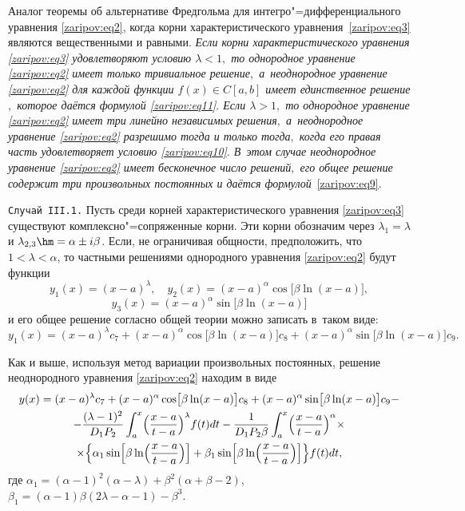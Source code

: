 {\small\sc Аналог теоремы об альтернативе Фредгольма для интегро"=дифференциального уравнения \eqref{zaripov:eq2}, когда корни характеристического уравнения~\eqref{zaripov:eq3} являются вещественными и равными.} 
\emph{Если корни характеристического уравнения \eqref{zaripov:eq3} удовлетворяют условию $\lambda<1,$  то однородное уравнение \eqref{zaripov:eq2} имеет только тривиальное решение$,$ а~неоднородное уравнение \eqref{zaripov:eq2} для каждой функции $f(x)\in C[a,b]$  имеет единственное решение$,$ которое даётся формулой \eqref{zaripov:eq11}$.$ 
Если $\lambda>1,$  то однородное уравнение \eqref{zaripov:eq2} имеет три линейно независимых решения$,$ а~неоднородное уравнение \eqref{zaripov:eq2} разрешимо тогда и только тогда$,$ когда его правая часть удовлетворяет условию \eqref{zaripov:eq10}$.$ 
В~этом  случае неоднородное уравнение \eqref{zaripov:eq2} имеет бесконечное число решений$,$  его общее решение содержит три произвольных постоянных и даётся формулой}~\eqref{zaripov:eq9}.


\smallskip

\texttt{Случай III.1.}  
Пусть среди корней характеристического уравнения \eqref{zaripov:eq3} существуют комплексно"=сопряженные корни. 
Эти корни обозначим через ${\lambda_1=\lambda}$ и ${\lambda_{2,3}}\hm ={\alpha}\pm{i\beta}$. 
Если, не ограничивая общности, предположить, что $1<\lambda<\alpha$, то частными решениями однородного уравнения \eqref{zaripov:eq2} будут функции
 $$
 y_1(x)=(x-a)^{\lambda},\quad  y_2(x)=(x-a)^\alpha\cos\bigl[\beta\ln(x-a)\bigr],$$
 $$ y_3(x)=(x-a)^\alpha\sin\bigl[\beta\ln(x-a)\bigr]$$ 
 и его общее решение согласно общей теории можно записать в~таком виде:
  \begin{equation*}
y_1(x)=(x-a)^{\lambda}c_7+(x-a)^\alpha\cos\bigl[\beta\ln(x-a)\bigr]c_8+(x-a)^\alpha\sin\bigl[\beta\ln(x-a)\bigr]c_9.
\end{equation*}

Как и выше, используя метод вариации произвольных постоянных, решение неоднородного уравнения \eqref{zaripov:eq2} находим в виде
\begin{multline}
y(x)=(x-a)^{\lambda}c_7+(x-a)^\alpha\cos\bigl[\beta\ln(x-a)\bigr]c_8
+(x-a)^\alpha\sin\bigl[\beta\ln(x-a)\bigr]c_9-\\
-\frac{(\lambda-1)^2}{D_1P_2}\int _{a}^{x}
\Bigl(\frac{x-a}{t-a}\Bigr)^\lambda f(t)dt-
\frac{1}{D_1P_2\beta}\int _{a}^{x}
\Bigl(\frac{x-a}{t-a}\Bigr)^\alpha\times\\
\times\Bigl\{\alpha_1\sin\Bigl[\beta\ln\Bigl(\frac{x-a}{t-a}\Bigr)\Bigr]+
\beta_1\sin\Bigl[\beta\ln\Bigl(\frac{x-a}{t-a}\Bigr)\Bigr]\Bigr\}f(t)dt,
\label{zaripov:eq12}
\end{multline}
где $\alpha_1=(\alpha-1)^2(\alpha-\lambda)+\beta^2(\alpha+\beta-2)$, $\beta_1=(\alpha-1)\beta(2\lambda-\alpha-1)-\beta^3$.


